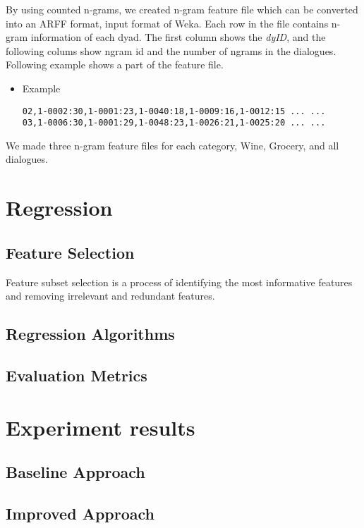 \documentclass[11pt]{article} %
\begin{document}
\begin{itemize}
By using counted n-grams, we created n-gram feature file which can be converted into an ARFF format, input format of Weka. Each row in the file contains n-gram information of each dyad. The first column shows the \textit{dyID}, and the following colums show ngram id and the number of ngrams in the dialogues. Following example shows a part of the feature file.
\begin{itemize}
\item Example
\begin{verbatim}
02,1-0002:30,1-0001:23,1-0040:18,1-0009:16,1-0012:15 ... ...
03,1-0006:30,1-0001:29,1-0048:23,1-0026:21,1-0025:20 ... ...
\end{verbatim}
\end{itemize}
We made three n-gram feature files for each category, Wine, Grocery, and all dialogues.
\end{itemize}




\section{Regression}
\subsection{Feature Selection}
Feature subset selection is a process of identifying the most informative features and removing irrelevant and redundant features. 

\subsection{Regression Algorithms}

\subsection{Evaluation Metrics}



\section{Experiment results}
\subsection{Baseline Approach}

\subsection{Improved Approach}
\end{document}

